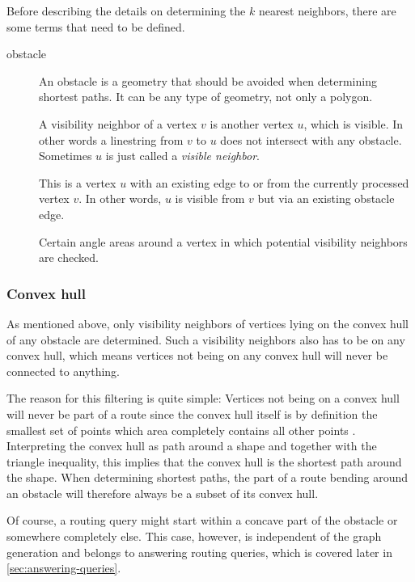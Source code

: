 				Before describing the details on determining the $k$ nearest neighbors, there are some terms that need to be defined.
				
				\begin{description}
					\item[obstacle] An obstacle is a geometry that should be avoided when determining shortest paths. It can be any type of geometry, not only a polygon.
					\item[] A visibility neighbor of a vertex $v$ is another vertex $u$, which is visible. In other words a linestring from $v$ to $u$ does not intersect with any obstacle. Sometimes $u$ is just called a \emph{visible neighbor}.
					\item[] This is a vertex $u$ with an existing edge to or from the currently processed vertex $v$. In other words, $u$ is visible from $v$ but via an existing obstacle edge.
					\item[] Certain angle areas around a vertex in which potential visibility neighbors are checked.
				\end{description}
				
			\subsubsection{Convex hull}
				
				As mentioned above, only visibility neighbors of vertices lying on the convex hull of any obstacle are determined.
				Such a visibility neighbors also has to be on any convex hull, which means vertices not being on any convex hull will never be connected to anything.
				
				The reason for this filtering is quite simple:
				Vertices not being on a convex hull will never be part of a route since the convex hull itself is by definition the smallest set of points which area completely contains all other points \cite[2]{de-berg-computational-geometry}.
				Interpreting the convex hull as path around a shape and together with the triangle inequality, this implies that the convex hull is the shortest path around the shape.
				When determining shortest paths, the part of a route bending around an obstacle will therefore always be a subset of its convex hull.
				
				Of course, a routing query might start within a concave part of the obstacle or somewhere completely else.
				This case, however, is independent of the graph generation and belongs to answering routing queries, which is covered later in \cref{sec:answering-queries}.
				
